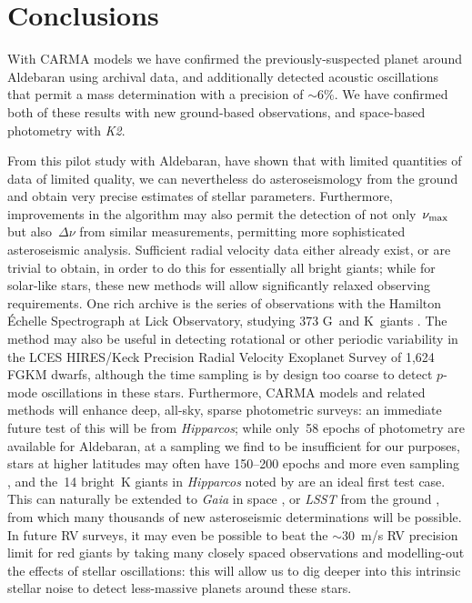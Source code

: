 \documentclass[modern]{aastex61}
\newcommand{\numax}{\mbox{$\nu_{\rm max}$}\xspace}
\newcommand{\Dnu}{\mbox{$\Delta \nu$}\xspace}
\newcommand{\hipparcos}{\emph{Hipparcos}\xspace}
\newcommand{\ktwo}{\emph{K2}\xspace}
\begin{document}
\section{Conclusions}

With CARMA models we have confirmed the previously-suspected planet around Aldebaran using archival data, and additionally detected acoustic oscillations that permit a mass determination with a precision of $\sim 6\%$. We have confirmed both of these results with new ground-based observations, and space-based photometry with \ktwo.

From this pilot study with Aldebaran, have shown that with limited quantities of data of limited quality, we can nevertheless do asteroseismology from the ground and obtain very precise estimates of stellar parameters. Furthermore, improvements in the algorithm may also permit the detection of not only~\numax but also~\Dnu from similar measurements, permitting more sophisticated asteroseismic analysis. Sufficient radial velocity data either already exist, or are trivial to obtain, in order to do this for essentially all bright giants; while for solar-like stars, these new methods will allow significantly relaxed observing requirements. One rich archive is the series of observations with the Hamilton \'{E}chelle Spectrograph at Lick Observatory, studying 373 G~and K~giants \citep[e.g.][]{frink2001,hekker2006,ortiz2016}. The method may also be useful in detecting rotational or other periodic variability in the LCES HIRES/Keck Precision Radial Velocity Exoplanet Survey \citep{butler17} of 1,624 FGKM dwarfs, although the time sampling is by design too coarse to detect $p$-mode oscillations in these stars. Furthermore, CARMA models and related methods will enhance deep, all-sky, sparse photometric surveys: an immediate future test of this will be from \hipparcos; while only~58 epochs of photometry are available for Aldebaran, at a sampling we find to be insufficient for our purposes, stars at higher latitudes may often have 150--200 epochs and more even sampling \citep{hipparcos_phot}, and the~14 bright~K giants in \hipparcos noted by \citet{bedding2000} are an ideal first test case. This can naturally be extended to \emph{Gaia} in space \citep{gaia}, or \emph{LSST} from the ground \citep{dmt,lsst,lsstbook}, from which many thousands of new asteroseismic determinations will be possible. In future RV surveys, it may even be possible to beat the \citet{2005PASJ...57...97S} $\sim 30$~m/s RV precision limit for red giants by taking many closely spaced observations and modelling-out the effects of stellar oscillations: this will allow us to dig deeper into this intrinsic stellar noise to detect less-massive planets around these stars.
\end{document}
